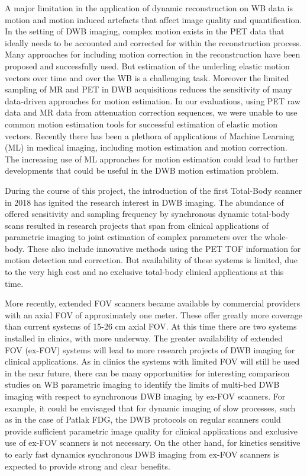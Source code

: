 A major limitation in the application of dynamic reconstruction on WB data is motion and motion induced artefacts that affect image quality and quantification. 
In the setting of DWB imaging, complex motion exists in the PET data that ideally needs to be accounted and corrected for within the reconstruction process. 
Many approaches for including motion correction in the reconstruction have been proposed and successfully used. But estimation of the underling elastic motion vectors over time and over the WB is a challenging task. Moreover the limited sampling of MR and PET in DWB acquisitions reduces the sensitivity of many data-driven approaches for motion estimation. In our evaluations, using PET raw data and MR data from attenuation correction sequences, we were unable to use common motion estimation tools for successful estimation of elastic motion vectors.
Recently there has been a plethora of applications of Machine Learning (ML) in medical imaging, including motion estimation and motion correction.
The increasing use of ML approaches for motion estimation could lead to further developments that could be useful in the DWB motion estimation problem.

During the course of this project, the introduction of the first Total-Body scanner in 2018 has ignited the research interest in DWB imaging. The abundance of offered sensitivity and sampling frequency by synchronous dynamic total-body scans resulted in research projects that span from clinical applications of parametric imaging to joint estimation of complex parameters over the whole-body. These also include innovative methods using the PET TOF information for motion detection and correction.
But availability of these systems is limited, due to the very high cost and no exclusive total-body clinical applications at this time.

More recently, extended FOV scanners became available by commercial providers with an axial FOV of approximately one meter. These offer greatly more coverage than current systems of 15-26 cm axial FOV. At this time there are two systems installed in clinics, with more underway. The greater availability of extended FOV (ex-FOV) systems will lead to more research projects of DWB imaging for clinical applications. As in clinics the systems with limited FOV will still be used in the near future, there can be many opportunities for interesting comparison studies on WB parametric imaging to identify the limits of multi-bed DWB imaging with respect to synchronous DWB imaging by ex-FOV scanners.
For example, it could be envisaged that for dynamic imaging of slow processes, such as in the case of Patlak FDG, the DWB protocols on regular scanners could provide sufficient parametric image quality for clinical applications and exclusive use of ex-FOV scanners is not necessary. On the other hand, for kinetics sensitive to early fast dynamics synchronous DWB imaging from ex-FOV scanners is expected to provide strong and clear benefits.


